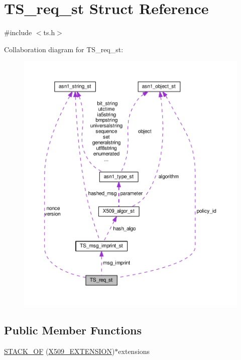 \hypertarget{struct_t_s__req__st}{}\section{T\+S\+\_\+req\+\_\+st Struct Reference}
\label{struct_t_s__req__st}


{\ttfamily \#include $<$ts.\+h$>$}



Collaboration diagram for T\+S\+\_\+req\+\_\+st\+:
\nopagebreak
\begin{figure}[H]
\begin{center}
\leavevmode
\includegraphics[width=350pt]{struct_t_s__req__st__coll__graph}
\end{center}
\end{figure}
\subsection*{Public Member Functions}
\begin{DoxyCompactItemize}
\item 
\hyperlink{struct_t_s__req__st_ae950d4f564b7e7c10e971168d32fcb9f}{S\+T\+A\+C\+K\+\_\+\+OF} (\hyperlink{x509_8h_ab2f7f7dc0ced8684e0cbfc818e408304}{X509\+\_\+\+E\+X\+T\+E\+N\+S\+I\+ON})$\ast$extensions
\end{DoxyCompactItemize}
